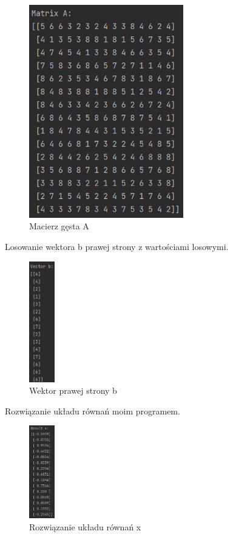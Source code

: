 \documentclass[9pt]{article}
\begin{document}
\begin{figure}[h]
  \centering
  \includegraphics[width=0.6\textwidth]{matrix_A_2.jpg}
  \caption{Macierz gęsta A}
\end{figure}
\newpage

Losowanie wektora b prawej strony z wartościami losowymi.

\begin{figure}[h]
  \centering
  \includegraphics[width=0.1\textwidth]{vector_B_2.jpg}
  \caption{Wektor prawej strony b}
\end{figure}
\newpage

Rozwiązanie układu równań moim programem.

\begin{figure}[h]
  \centering
  \includegraphics[width=0.1\textwidth]{result_x_2.jpg}
  \caption{Rozwiązanie układu równań x}
\end{figure}
\newpage
\end{document}
